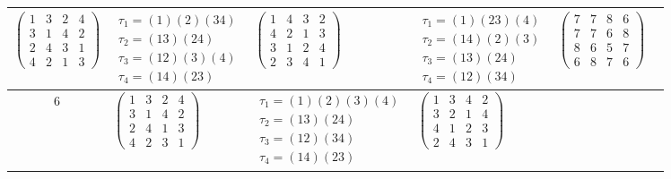 \begin{longtable}{|c|p{2.7cm}|p{2.7cm}|p{2.7cm}|p{2.7cm}|p{2.7cm}|}
    $\begin{pmatrix} 1 & 3 & 2 & 4 \\ 3 & 1 & 4 & 2 \\ 2 & 4 & 3 & 1 \\ 4 & 2 & 1 & 3 \end{pmatrix}$               &
    $\begin{array}{l}\tau_{1}=(1)(2)(34)\\ \tau_{2}=(13)(24)\\ \tau_{3}=(12)(3)(4)\\ \tau_{4}=(14)(23)\end{array}$ &
    $\begin{pmatrix} 1 & 4 & 3 & 2 \\ 4 & 2 & 1 & 3 \\ 3 & 1 & 2 & 4 \\ 2 & 3 & 4 & 1 \end{pmatrix}$               &
    $\begin{array}{l}\tau_{1}=(1)(23)(4)\\ \tau_{2}=(14)(2)(3)\\ \tau_{3}=(13)(24)\\ \tau_{4}=(12)(34)\end{array}$ &
    $\begin{pmatrix} 7 & 7 & 8 & 6 \\ 7 & 7 & 6 & 8 \\ 8 & 6 & 5 & 7 \\ 6 & 8 & 7 & 6 \end{pmatrix}$                                                                                           \\
    \hline
    6                                                                                                              &
    $\begin{pmatrix} 1 & 3 & 2 & 4 \\ 3 & 1 & 4 & 2 \\ 2 & 4 & 1 & 3 \\ 4 & 2 & 3 & 1 \end{pmatrix}$               &
    $\begin{array}{l}\tau_{1}=(1)(2)(3)(4)\\ \tau_{2}=(13)(24)\\ \tau_{3}=(12)(34)\\ \tau_{4}=(14)(23)\end{array}$ &
    $\begin{pmatrix} 1 & 3 & 4 & 2 \\ 3 & 2 & 1 & 4 \\ 4 & 1 & 2 & 3 \\ 2 & 4 & 3 & 1 \end{pmatrix}$               &

\end{longtable}
